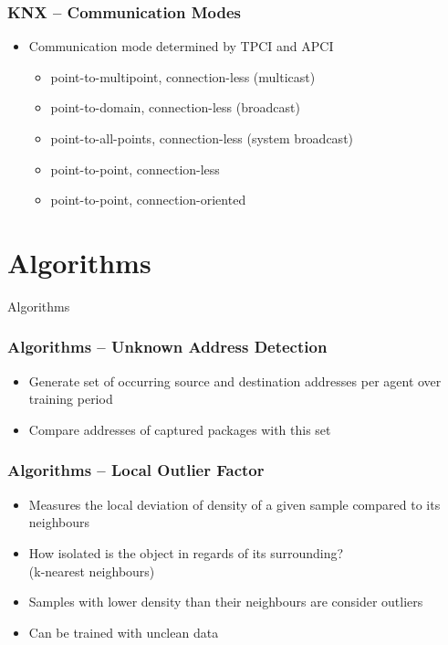 \begin{frame}[c]
	\frametitle{KNX -- Communication Modes}
	\begin{itemize}
	\item Communication mode determined by TPCI and APCI
	\begin{itemize}
		\item point-to-multipoint, connection-less (multicast)
		\item point-to-domain, connection-less (broadcast)
		\item point-to-all-points, connection-less (system broadcast)
		\item point-to-point, connection-less
		\item point-to-point, connection-oriented
	\end{itemize}
	
	\end{itemize}
	
\end{frame}

\section{Algorithms}
\begin{frame}[c]
	\centering
	\LARGE Algorithms
\end{frame}

\begin{frame}[c]
	\frametitle{Algorithms -- Unknown Address Detection}
	
	\begin{itemize}
		\item Generate set of occurring source and destination addresses per agent over training period
		\item Compare addresses of captured packages with this set
	\end{itemize}
\end{frame}

\begin{frame}[c]
	\frametitle{Algorithms -- Local Outlier Factor}
	
	\begin{itemize}
	\item Measures the local deviation of density of a given sample compared to its neighbours \parencite{Pedregosa2011}
	\item How isolated is the object in regards of its surrounding? \\ (k-nearest neighbours)
	\item Samples with lower density than their neighbours are consider outliers
	\item Can be trained with unclean data
	\end{itemize}
\end{frame}

